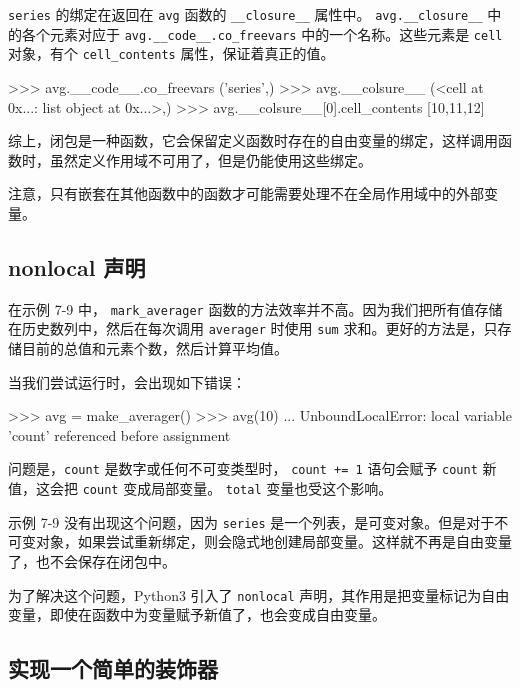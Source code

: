 \texttt{series} 的绑定在返回在 \texttt{avg} 函数的 \texttt{\_\_closure\_\_} 属性中。 \texttt{avg.\_\_closure\_\_} 中的各个元素对应于 \texttt{avg.\_\_code\_\_.co\_freevars} 中的一个名称。这些元素是 \texttt{cell} 对象，有个 \texttt{cell\_contents} 属性，保证着真正的值。

\begin{python}
>>> avg.__code__.co_freevars
('series',)
>>> avg.__colsure__
(<cell at 0x...: list object at 0x...>,)
>>> avg.__colsure__[0].cell_contents
[10,11,12]
\end{python}

综上，闭包是一种函数，它会保留定义函数时存在的自由变量的绑定，这样调用函数时，虽然定义作用域不可用了，但是仍能使用这些绑定。

注意，只有嵌套在其他函数中的函数才可能需要处理不在全局作用域中的外部变量。

\subsection{nonlocal 声明}

在示例 7-9 中， \texttt{mark\_averager} 函数的方法效率并不高。因为我们把所有值存储在历史数列中，然后在每次调用 \texttt{averager} 时使用 \texttt{sum} 求和。更好的方法是，只存储目前的总值和元素个数，然后计算平均值。



当我们尝试运行时，会出现如下错误：
\begin{python}
    >>> avg = make_averager()
    >>> avg(10)
    ...
    UnboundLocalError: local variable 'count' referenced before assignment
\end{python}

问题是，\texttt{count} 是数字或任何不可变类型时， \texttt{count += 1} 语句会赋予 \texttt{count} 新值，这会把 \texttt{count} 变成局部变量。 \texttt{total} 变量也受这个影响。

示例 7-9 没有出现这个问题，因为 \texttt{series} 是一个列表，是可变对象。但是对于不可变对象，如果尝试重新绑定，则会隐式地创建局部变量。这样就不再是自由变量了，也不会保存在闭包中。

为了解决这个问题，Python3 引入了 \texttt{nonlocal} 声明，其作用是把变量标记为自由变量，即使在函数中为变量赋予新值了，也会变成自由变量。

\subsection{实现一个简单的装饰器}

